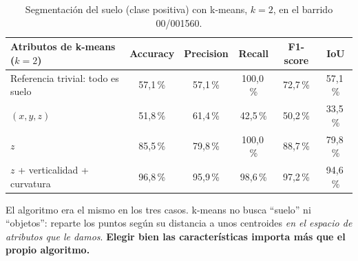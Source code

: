 \documentclass{article}
\begin{document}
\begin{table}[h]
\centering
\begin{tabular}{lccccc}
\toprule
Atributos de k-means ($k = 2$) & Accuracy & Precision & Recall & F1-score & IoU \\
\midrule
Referencia trivial: todo es suelo & 57{,}1\,\% & 57{,}1\,\% & 100{,}0\,\% & 72{,}7\,\% & 57{,}1\,\% \\
$(x, y, z)$ & 51{,}8\,\% & 61{,}4\,\% & 42{,}5\,\% & 50{,}2\,\% & 33{,}5\,\% \\
$z$ & 85{,}5\,\% & 79{,}8\,\% & 100{,}0\,\% & 88{,}7\,\% & 79{,}8\,\% \\
$z$ + verticalidad + curvatura & 96{,}8\,\% & 95{,}9\,\% & 98{,}6\,\% & 97{,}2\,\% & 94{,}6\,\% \\
\bottomrule
\end{tabular}
\caption{Segmentación del suelo (clase positiva) con k-means, $k = 2$, en el barrido 00/001560.}
\label{tab:suelo}
\end{table}

\begin{tcolorbox}[colback=yellow!8!white, colframe=orange!70!black, title=\textbf{Moraleja}]
El algoritmo era el mismo en los tres casos. k-means no busca ``suelo'' ni ``objetos'': reparte los puntos según su distancia a unos centroides \emph{en el espacio de atributos que le damos}. \textbf{Elegir bien las características importa más que el propio algoritmo.}
\end{tcolorbox}
\end{document}
